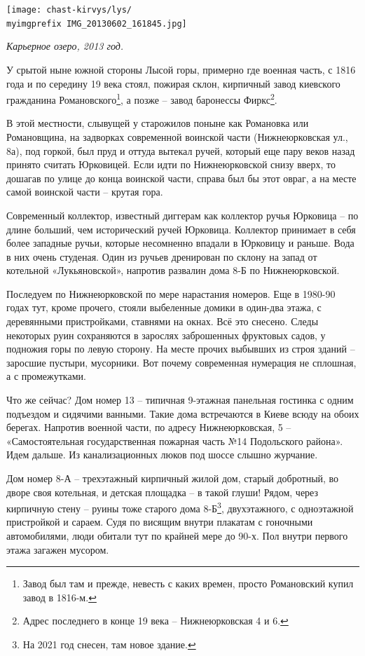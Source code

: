 \begin{center}
\texttt{[image: chast-kirvys/lys/\\myimgprefix IMG\_20130602\_161845.jpg]}

\textit{Карьерное озеро, 2013 год.}
\end{center} 

У срытой ныне южной стороны Лысой горы, примерно где военная часть, с 1816 года и по середину 19 века стоял, пожирая склон, кирпичный завод киевского гражданина Романовского\footnote{Завод был там и прежде, невесть с каких времен, просто Романовский купил завод в 1816-м.}, а позже – завод баронессы Фиркс\footnote{Адрес последнего в конце 19 века – Нижнеюрковская 4 и 6.}.

В этой местности, слывущей у старожилов поныне как Романовка или Романовщина, на задворках современной воинской части (Нижнеюрковская ул., 8а), под горкой, был пруд и оттуда вытекал ручей, который еще пару веков назад принято считать Юрковицей. Если идти по Нижнеюрковской снизу вверх, то дошагав по улице до конца воинской части, справа был бы этот овраг, а на месте самой воинской части – крутая гора. 

Современный коллектор, известный диггерам как коллектор ручья Юрковица – по длине больший, чем исторический ручей Юрковица. Коллектор принимает в себя более западные ручьи, которые несомненно впадали в Юрковицу и раньше. Вода в них очень студеная. Один из ручьев дренирован по склону на запад от котельной «Лукьяновской», напротив развалин дома 8-Б по Нижнеюрковской.

Последуем по Нижнеюрковской по мере нарастания номеров. Еще в 1980-90 годах тут, кроме прочего, стояли  выбеленные домики в один-два этажа, с деревянными пристройками, ставнями на окнах. Всё это снесено. Следы некоторых руин сохраняются в зарослях заброшенных фруктовых садов, у подножия горы по левую сторону. На месте прочих выбывших из строя зданий – заросшие пустыри, мусорники. Вот почему современная нумерация не сплошная, а с промежутками.

Что же сейчас? Дом номер 13 – типичная 9-этажная панельная гостинка с одним подъездом и сидячими ванными. Такие дома встречаются в Киеве всюду на обоих берегах. Напротив военной части, по адресу Нижнеюрковская, 5 – «Самостоятельная государственная пожарная часть №14 Подольского района». Идем дальше. Из канализационных люков под шоссе слышно журчание.

Дом номер 8-А – трехэтажный кирпичный жилой дом, старый добротный, во дворе своя котельная, и детская площадка – в такой глуши! Рядом, через кирпичную стену – руины тоже старого дома 8-Б\footnote{На 2021 год снесен, там новое здание.}, двухэтажного, с одноэтажной пристройкой и сараем. Судя по висящим внутри плакатам с гоночными автомобилями, люди обитали тут по крайней мере до 90-х. Пол внутри первого этажа загажен мусором. 


